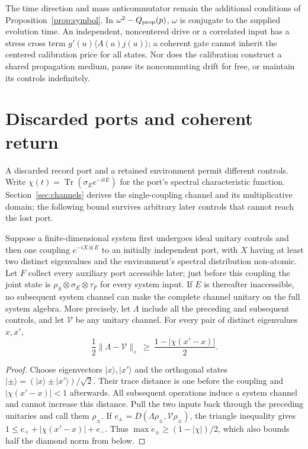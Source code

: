 The time direction and mass anticommutator remain the additional
conditions of Proposition~\ref{prop:symbol}. In
$\omega^2-Q_{\rm prop}(p)$, $\omega$ is conjugate to the supplied
evolution time. An independent, noncentered drive or a correlated
input has a stress cross term $g'(u)\langle A(a)j(u)\rangle$;
a coherent gate cannot inherit the centered calibration price for
all states. Nor does the calibration construct a shared propagation
medium, pause its noncommuting drift for free, or maintain its
controls indefinitely.

\section{Discarded ports and coherent return}
\label{sec:return}

A discarded record port and a retained environment permit different controls.
Write $\chi(t)=\operatorname{Tr}(\sigma_Ee^{-itE})$ for the port's
spectral characteristic function. Section~\ref{sec:channels} derives
the single-coupling channel and its multiplicative domain; the following
bound survives arbitrary later controls that cannot reach the lost port.

\begin{proposition}\label{prop:fresh}
Suppose a finite-dimensional system first undergoes ideal unitary controls and then
one coupling $e^{-iX\otimes E}$ to an initially independent port, with $X$ having at least two
distinct eigenvalues and the environment's spectral distribution non-atomic. Let
$F$ collect every auxiliary port accessible later; just before this coupling the
joint state is $\rho_S\otimes\sigma_E\otimes\tau_F$ for every system input.
If $E$ is thereafter inaccessible,
no subsequent system channel can make the complete channel unitary on the full
system algebra. More precisely, let $\Lambda$ include all the preceding and
subsequent controls, and let $\mathcal V$ be any unitary channel. For every pair of
distinct eigenvalues $x,x'$,
\begin{equation}
 \frac12\|\Lambda-\mathcal V\|_\diamond
 \ \ge\ \frac{1-|\chi(x'-x)|}{2}.
 \label{eq:freshdistance}
\end{equation}
\end{proposition}
\begin{proof}
Choose eigenvectors $|x\rangle,|x'\rangle$ and the orthogonal states
$|\pm\rangle=(|x\rangle\pm|x'\rangle)/\sqrt2$. Their trace distance is one before
the coupling and $|\chi(x'-x)|<1$ afterwards. All subsequent operations induce a
system channel and cannot increase this distance. Pull the two inputs back through
the preceding unitaries and call them $\rho_\pm$. If
$e_\pm=D(\Lambda\rho_\pm,\mathcal V\rho_\pm)$, the triangle inequality gives
$1\le e_++|\chi(x'-x)|+e_-$. Thus $\max e_\pm\ge(1-|\chi|)/2$,
which also bounds half the diamond norm from below.
\end{proof}

